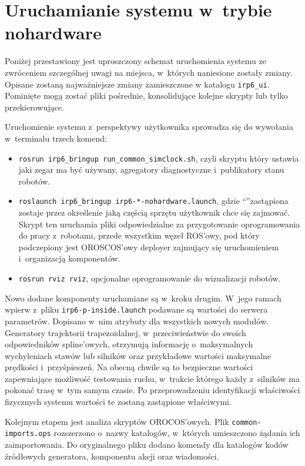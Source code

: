 \documentclass[a4paper, 12pt]{article}
\begin{document}
	\section{Uruchamianie systemu w~trybie nohardware}
	\label{sec:boot}
	
	Poniżej przestawiony jest uproszczony schemat uruchomienia systemu ze zwróceniem szczególnej uwagi na miejsca, w~których naniesione zostały zmiany. Opisane zostaną najważniejsze zmiany zamieszczone w katalogu \texttt{irp6\_ui}. Pominięte mogą zostać pliki pośrednie, konsolidujące kolejne skrypty lub tylko przekierowujące. 
	\par Uruchomienie systemu z~perspektywy użytkownika sprowadza się do wywołania w~terminalu trzech komend:
	\begin{itemize}
	\item \texttt{rosrun irp6\_bringup run\_common\_simclock.sh}, czyli skryptu który ustawia jaki zegar ma być używany, agregatory diagnostyczne i~publikatory stanu robotów. 
	\item \texttt{roslaunch irp6\_bringup irp6-*-nohardware.launch}, gdzie \textquotedblleft * \textquotedblright zastąpiona zostaje przez określenie jaką częścią sprzętu użytkownik chce się zajmować. Skrypt ten uruchamia pliki odpowiedzialne za przygotowanie oprogramowania do pracy z~robotami, przede wszystkim węzeł ROS'owy, pod który podczepiony jest OROSCOS'owy deployer zajmujący się uruchomieniem i~organizacją komponentów.
	\item \texttt{rosrun rviz rviz}, opcjonalne oprogramowanie do wizualizacji robotów.
	\end{itemize} 
	\par
	Nowo dodane komponenty uruchamiane są w~kroku drugim. W~jego ramach wpierw z~pliku \linebreak \texttt{irp6-p-inside.launch} podawane są wartości do serwera parametrów. Dopisano w~nim atrybuty dla wszystkich nowych modułów. 
	Generatory trajektorii trapezoidalnej, w~przeciwieństwie do swoich odpowiedników spline'owych, otrzymują informację o~maksymalnych wychyleniach stawów lub silników oraz przykładowe wartości maksymalne prędkości i~przyśpieszeń. Na obecną chwile są to bezpieczne wartości zapewniające możliwość testowania ruchu, w~trakcie którego każdy z~silników ma pokonać trasę w~tym samym czasie. 
	Po przeprowadzeniu identyfikacji właściwości fizycznych systemu wartości te zostaną zastąpione właściwymi.
	\par 
	Kolejnym etapem jest analiza skryptów OROCOS'owych. Plik \texttt{common-imports.ops} rozszerzono o~nazwy katalogów, w~których umieszczono żądania ich zaimportowania. Do oryginalnego pliku dodano komendy dla katalogów kodów źródłowych generatora, komponentu akcji oraz wiadomości.
\end{document}
